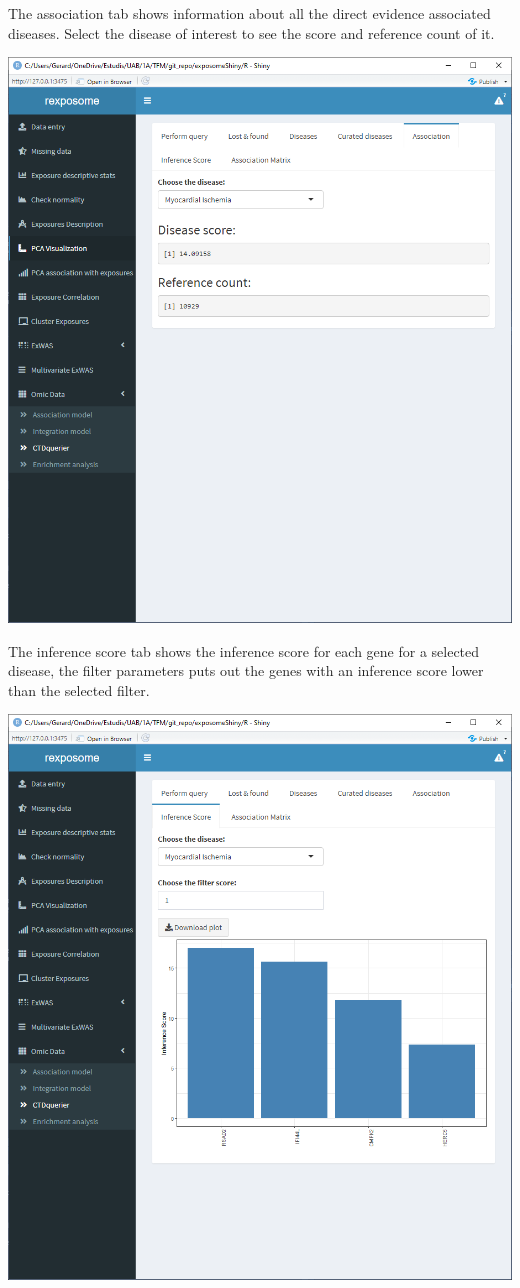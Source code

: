 \documentclass[
]{book}
\begin{document}
The association tab shows information about all the direct evidence associated diseases. Select the disease of interest to see the score and reference count of it.

\includegraphics{images/analysis10_7.png}

The inference score tab shows the inference score for each gene for a selected disease, the filter parameters puts out the genes with an inference score lower than the selected filter.

\includegraphics{images/analysis10_8.png}
\end{document}
